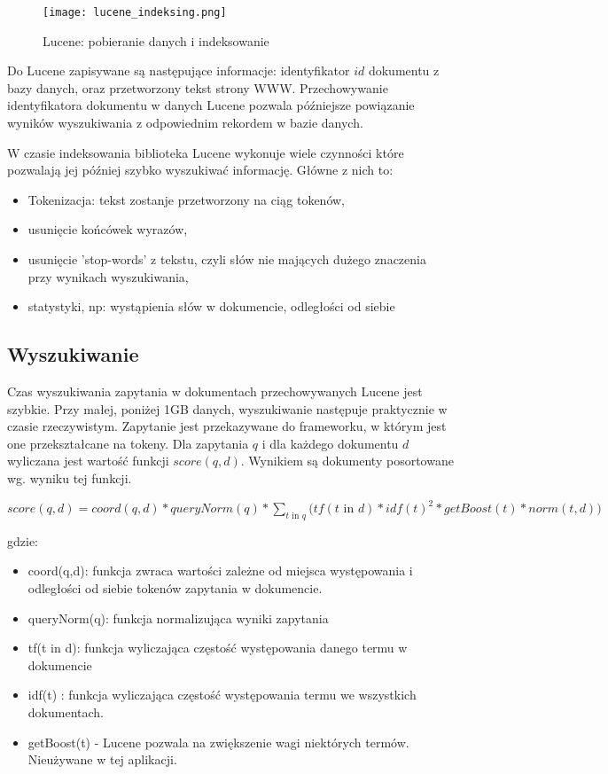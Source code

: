 \begin{figure}[htb]

\texttt{[image: lucene\_indeksing.png]}
\caption{Lucene: pobieranie danych i indeksowanie}
\label{fig:lucene_index_fig}
\end{figure}

Do Lucene zapisywane są następujące informacje: identyfikator $id$ dokumentu z bazy danych, oraz przetworzony tekst strony WWW. Przechowywanie identyfikatora dokumentu w danych Lucene pozwala późniejsze powiązanie wyników wyszukiwania z odpowiednim rekordem w bazie danych. 

W czasie indeksowania biblioteka Lucene wykonuje wiele czynności które pozwalają jej później szybko wyszukiwać informację. Główne z nich to:
\begin{itemize}
\item Tokenizacja: tekst zostanje przetworzony na ciąg tokenów,
\item usunięcie końcówek wyrazów,
\item usunięcie 'stop-words' z tekstu, czyli słów nie mających dużego znaczenia przy wynikach wyszukiwania,
\item statystyki, np: wystąpienia słów w dokumencie, odległości od siebie
\end{itemize}

\subsection{Wyszukiwanie}

Czas wyszukiwania zapytania w dokumentach przechowywanych Lucene jest szybkie. Przy małej, poniżej 1GB danych, wyszukiwanie następuje praktycznie w czasie rzeczywistym. Zapytanie jest przekazywane do frameworku, w którym jest one przekształcane na tokeny. Dla zapytania $q$ i dla każdego dokumentu $d$ wyliczana jest wartość funkcji $score(q,d)$. Wynikiem są dokumenty posortowane wg. wyniku tej funkcji.

$score(q,d) =   coord(q,d)  *  queryNorm(q) * \sum_{t \text{ in } q}  \bigg( tf(t\text{ in } d)  *  idf(t)^2  *  getBoost(t) *  norm(t,d) )$

gdzie:
\begin{itemize}
	\item coord(q,d): funkcja zwraca wartości zależne od miejsca występowania i odległości od siebie tokenów zapytania w dokumencie.
	\item queryNorm(q): funkcja normalizująca wyniki zapytania
	\item tf(t in d): funkcja wyliczająca częstość występowania danego termu w dokumencie
	\item idf(t) : funkcja wyliczająca częstość występowania termu we wszystkich dokumentach.
	\item getBoost(t) - Lucene pozwala na zwiększenie wagi niektórych termów. Nieużywane w tej aplikacji.
\end{itemize}

